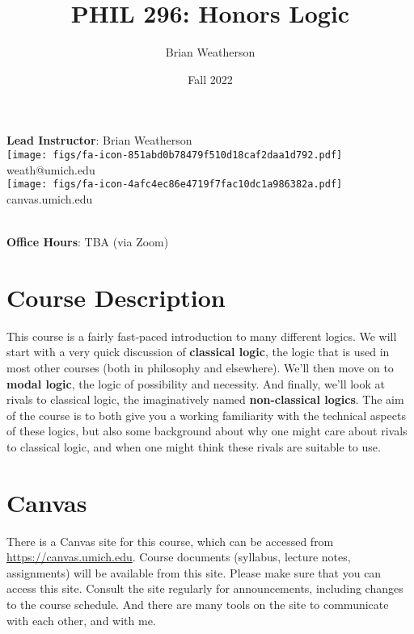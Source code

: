 \documentclass[
]{article}
\title{PHIL 296: Honors Logic}
\author{Brian Weatherson}
\date{Fall 2022}
\begin{document}
\maketitle
\ifdefined\Shaded\renewenvironment{Shaded}{\begin{tcolorbox}[enhanced, interior hidden, breakable, frame hidden, borderline west={3pt}{0pt}{shadecolor}, boxrule=0pt, sharp corners]}{\end{tcolorbox}}\fi

\textbf{Lead Instructor}: Brian Weatherson\\
\texttt{[image: figs/fa-icon-851abd0b78479f510d18caf2daa1d792.pdf]}
weath@umich.edu\\
\texttt{[image: figs/fa-icon-4afc4ec86e4719f7fac10dc1a986382a.pdf]}
canvas.umich.edu\\
\strut \\
\textbf{Office Hours}: TBA (via Zoom)\\

\hypertarget{course-description}{%
\section{Course Description}\label{course-description}}

This course is a fairly fast-paced introduction to many different
logics. We will start with a very quick discussion of \textbf{classical
logic}, the logic that is used in most other courses (both in philosophy
and elsewhere). We'll then move on to \textbf{modal logic}, the logic of
possibility and necessity. And finally, we'll look at rivals to
classical logic, the imaginatively named \textbf{non-classical logics}.
The aim of the course is to both give you a working familiarity with the
technical aspects of these logics, but also some background about why
one might care about rivals to classical logic, and when one might think
these rivals are suitable to use.

\hypertarget{canvas}{%
\section{Canvas}\label{canvas}}

There is a Canvas site for this course, which can be accessed from
\url{https://canvas.umich.edu}. Course documents (syllabus, lecture
notes, assignments) will be available from this site. Please make sure
that you can access this site. Consult the site regularly for
announcements, including changes to the course schedule. And there are
many tools on the site to communicate with each other, and with me.
\end{document}
